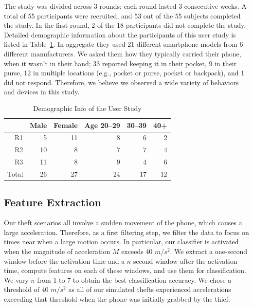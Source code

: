 \documentclass{soups}
\begin{document}
The study was divided across 3 rounds; each round lasted 3 consecutive weeks. 
A total of 55 participants were recruited, and
53 out of the 55 subjects completed the study. 
In the first round, 2 of the 18 participants did not complete the study.
Detailed demographic information about the participants of this user study is listed in Table~\ref{tbl:demographics}.
In aggregate they used 21 different smartphone models from 6 different manufacturers.
We asked them how they typically carried their phone, when it wasn't in their hand; 33 reported keeping it in their pocket, 9 in their purse, 12 in multiple locations (e.g., pocket or purse, pocket or backpack), and 1 did not respond.
Therefore, we believe we observed a wide variety of behaviors and devices in this study.

\begin{table}[H]
\centering
\begin{tabular}{rrrrrr}
\hline
      & Male & Female & Age 20--29 & 30--39 & 40+ \\ \hline
R1    & 5    & 11     & 8         & 6     & 2   \\
R2    & 10   & 8      & 7         & 7     & 4   \\
R3    & 11   & 8      & 9         & 4     & 6   \\
Total & 26   & 27     & 24        & 17    & 12  \\ \hline
\end{tabular}
\caption{Demographic Info of the User Study}
\label{tbl:demographics}
\end{table}




\subsection{Feature Extraction}
\label{s:features}

Our theft scenarios all involve a sudden movement of the phone, which causes a large acceleration.
Therefore, as a first filtering step, we filter the data to focus on times near when a large motion occurs.
In particular, our classifier is activated when the magnitude of acceleration $M$ exceeds 40 $m/s^2$.
We extract a one-second window before the activation time and a $n$-second window after the activation time, compute features on each of these windows, and use them for classification.
We vary $n$ from 1 to 7 to obtain the best classification accuracy.
We chose a threshold of 40 $m/s^2$ as all of our simulated thefts experienced accelerations exceeding that threshold when the phone was initially grabbed by the thief.
\end{document}

